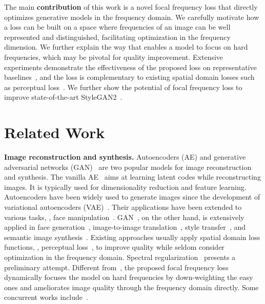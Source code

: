 \documentclass[10pt,twocolumn,letterpaper]{article}
\begin{document}
The main \textbf{contribution} of this work is a novel focal frequency loss that directly optimizes generative models in the frequency domain. We carefully motivate how a loss can be built on a space where frequencies of an image can be well represented and distinguished, facilitating optimization in the frequency dimension. We further explain the way that enables a model to focus on hard frequencies, which may be pivotal for quality improvement.
Extensive experiments demonstrate the effectiveness of the proposed loss on representative baselines~\cite{ae,vae,pix2pix,SPADE}, and the loss is complementary to existing spatial domain losses such as perceptual loss~\cite{perceptualloss}.
We further show the potential of focal frequency loss to improve state-of-the-art StyleGAN2~\cite{stylegan2}.
 

\section{Related Work}
\label{sec:relatedwork}

\noindent
\textbf{Image reconstruction and synthesis.}
Autoencoders (AE) \cite{ae,vae} and generative adversarial networks (GAN)~\cite{GAN} are two popular models for image reconstruction and synthesis.
The vanilla AE~\cite{ae} aims at learning latent codes while reconstructing images. It is typically used for dimensionality reduction and feature learning. 
Autoencoders have been widely used to generate images since the development of variational autoencoders (VAE)~\cite{vae,convae}. Their applications have been extended to various tasks, \eg, face manipulation~\cite{DeepFakes,DFL,deeperforensics1}.
GAN~\cite{GAN,congan,DCGAN}, on the other hand, is extensively applied in face generation~\cite{pggan,stylegan,stylegan2}, image-to-image translation~\cite{pix2pix,cyclegan,stargan,tsit}, style transfer~\cite{UNIT,MUNIT}, and semantic image synthesis~\cite{pix2pixhd,SPADE,CC-FPSE}.
Existing approaches usually apply spatial domain loss functions, \eg, perceptual loss~\cite{perceptualloss}, to improve quality while seldom consider optimization in the frequency domain.
Spectral regularization~\cite{specreg} presents a preliminary attempt.
Different from~\cite{perceptualloss,specreg}, the proposed focal frequency loss dynamically focuses the model on hard frequencies by down-weighting the easy ones and ameliorates image quality through the frequency domain directly.
Some concurrent works include~\cite{fdit,swagan,specgan}.
\end{document}
